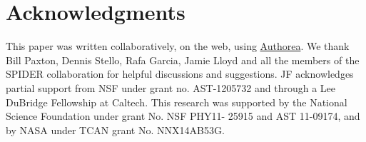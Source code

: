 \section*{Acknowledgments} 

This paper was written collaboratively, on the web, using \href{https://www.authorea.com}{Authorea}.
We thank Bill Paxton, Dennis Stello, Rafa Garcia, Jamie Lloyd and all the members of the SPIDER collaboration for helpful discussions and suggestions. JF acknowledges partial support from NSF under grant no. AST-1205732 and through a Lee DuBridge Fellowship at Caltech. This research was supported by the National Science Foundation under grant No. NSF PHY11- 25915 and AST 11-09174, and by NASA under TCAN grant No. NNX14AB53G.
